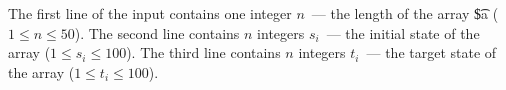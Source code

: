 The first line of the input contains one integer $n$~--- the length of the array \t{\$a}  ($1 \le n \le 50$). 
The second line contains $n$ integers $s_i$~--- the initial state of the array ($1 \le s_i \le 100$). 
The third line contains $n$ integers $t_i$~--- the target state of the array  ($1 \le t_i \le 100$).